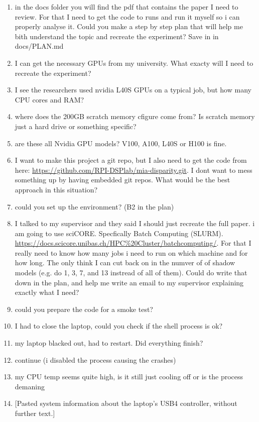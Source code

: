 \documentclass[a4paper]{article}
\newcommand{\prompt}[1]{{\raggedright\small\ttfamily\frenchspacing #1\par}}
\begin{document}
\begin{enumerate}
  \item \prompt{in the docs folder you will find the pdf that contains the paper I need to review. For that I need to get the code to runs and run it myself so i can properly analyse it. Could you make a step by step plan that will help me bith understand the topic and recreate the experiment? Save in in docs/PLAN.md}
  \item \prompt{I can get the necessary GPUs from my university. What exacty will I need to recreate the experiment?}
  \item \prompt{I see the researchers used nvidia L40S GPUs on a typical job, but how many CPU cores and RAM?}
  \item \prompt{where does the 200GB scratch memory cfigure come from? Is scratch memory just a hard drive or something specific?}
  \item \prompt{are these all Nvidia GPU models?  V100, A100, L40S or H100 is fine.}
  \item \prompt{I want to make this project a git repo, but I also need to get the code from here: \url{https://github.com/RPI-DSPlab/mia-disparity.git}. I dont want to mess something up by having embedded git repos. What would be the best approach in this situation?}
  \item \prompt{could you set up the environment? (B2 in the plan)}
  \item \prompt{I talked to my supervisor and they said I should just recreate the full paper. i am going to use sciCORE. Specfically Batch Computing (SLURM). \url{https://docs.scicore.unibas.ch/HPC\%20Cluster/batchcomputing/}. For that I really need to know how many jobs i need to run on which machine and for how long. The only think I can cut back on in the numver of of shadow models (e.g. do 1, 3, 7, and 13 instread of all of them). Could do write that down in the plan, and help me write an email to my supervisor explaining exactly what I need?}
  \item \prompt{could you prepare the code for a smoke test?}
  \item \prompt{I had to close the laptop, could you check if the shell process is ok?}
  \item \prompt{my laptop blacked out, had to restart. Did everything finish?}
  \item \prompt{continue (i disabled the process causing the crashes)}
  \item \prompt{my CPU temp seems quite high, is it still just cooling off or is the process demaning}
  \item {[Pasted system information about the laptop's USB4 controller, without further text.]}
\end{enumerate}



\end{document}
